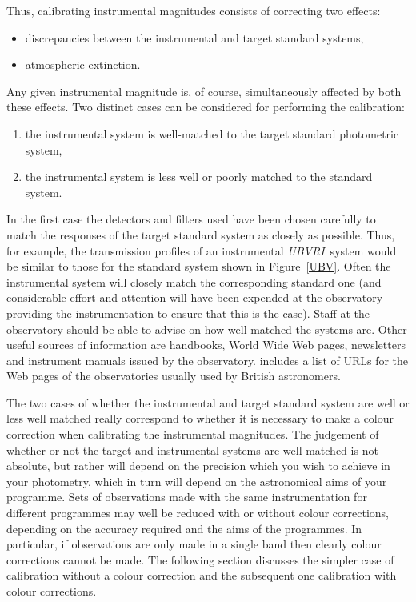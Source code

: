 \documentclass[twoside,11pt,nolof]{starlink}
\begin{document}
Thus, calibrating instrumental magnitudes consists of correcting two
effects:

\begin{itemize}

  \item discrepancies between the instrumental and target standard
   systems,

  \item atmospheric extinction.

\end{itemize}

Any given instrumental magnitude is, of course, simultaneously affected
by both these effects.  Two distinct cases can be considered for
performing the calibration:

\begin{enumerate}

  \item the instrumental system is well-matched to the target standard
   photometric system,

  \item the instrumental system is less well or poorly matched to the
   standard system.

\end{enumerate}

In the first case the detectors and filters used have been chosen
carefully to match the responses of the target standard system as
closely as possible.  Thus, for example, the transmission profiles of
an instrumental \textit{UBVRI}\, system would be similar to those for the
standard system shown in Figure~\ref{UBV}.  Often the instrumental
system will closely match the corresponding standard one (and
considerable effort and attention will have been expended at the
observatory providing the instrumentation to ensure that this is the
case).  Staff at the observatory should be able to advise on how
well matched the systems are.  Other useful sources of information
are handbooks, World Wide Web pages, newsletters and instrument manuals
issued by the observatory.  \/\cite{SG10} includes a list of URLs for the Web pages
of the observatories usually used by British astronomers.

The two cases of whether the instrumental and target standard system
are well or less well matched really correspond to whether it is
necessary to make a colour correction when calibrating the instrumental
magnitudes.  The judgement of whether or not the target and instrumental
systems are well matched is not absolute, but rather will depend on the
precision which you wish to achieve in your photometry, which in turn
will depend on the astronomical aims of your programme.  Sets of
observations made with the same instrumentation for different programmes
may well be reduced with or without colour corrections, depending on the
accuracy required and the aims of the programmes.  In particular, if
observations are only made in a single band then clearly colour
corrections cannot be made.  The following section discusses the simpler
case of calibration without a colour correction and the subsequent one
calibration with colour corrections.
\end{document}
